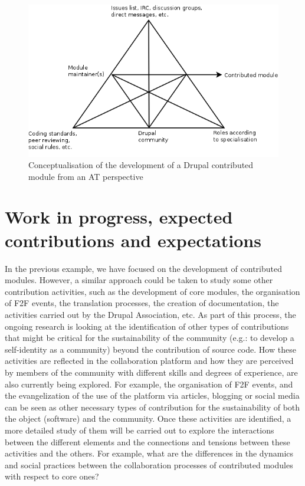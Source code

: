 \documentclass{sig-alternate}
\begin{document}
\begin{figure}
	\centering
	\includegraphics[scale=0.3]{drupal_module_at.png}
	\caption{Conceptualisation of the development of a Drupal contributed module from an AT perspective}
	\label{drupal_module_at}
\end{figure}


\section{Work in progress, expected contributions and expectations}

In the previous example, we have focused on the development of contributed modules. However, a similar approach could be taken to study some other contribution activities, such as the development of core modules, the organisation of F2F events, the translation
processes, the creation of documentation, the activities carried out by the Drupal Association, etc. As part of this process, the ongoing research is looking at the identification of other types of contributions that might be critical for the sustainability of the community (e.g.: to develop a self-identity as a community) beyond the contribution of source code. How these activities are reflected in the collaboration platform and how they are perceived by members of the community with different skills and degrees of experience, are also currently being explored. For example, the organisation of F2F events, and the evangelization of the use of the platform via articles, blogging or social media can be seen as other necessary types of contribution for the sustainability of both the object (software) and the community. Once these activities are identified, a more detailed study of them will be carried out to explore the interactions between the different elements and the connections and tensions between these activities and the others. For example, what are the differences in the dynamics and social practices between the collaboration processes of contributed modules with respect to core ones?
\end{document}
